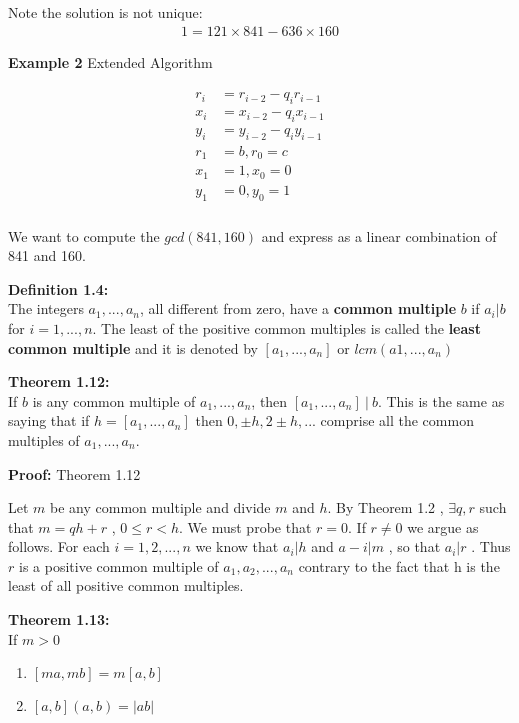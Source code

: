 \documentclass[a4paper]{article}
\begin{document}
Note the solution is not unique:
\begin{align*}
1=121\times841 - 636\times 160
\end{align*}

\textbf{Example 2} Extended Algorithm


\begin{align*}
\begin{split}
r_i&=r_{i-2} - q_ir_{i-1} \\
x_i&=x_{i-2} - q_ix_{i-1} \\
y_i&=y_{i-2} - q_iy_{i-1} \\
r_1&=b , r_0=c \\
x_1&=1 , x_0=0 \\
y_1&=0 , y_0=1 \\
\end{split}
\end{align*}



We want to compute the $gcd(841,160)$ and express as a linear combination
of 841 and 160.


\textbf{Definition 1.4:}\\
The integers $a_1,...,a_n$, all different from zero, have a
\textbf{common multiple} $b$ if $a_i|b$ for $i=1,...,n$. The least of
the positive common multiples is called the
\textbf{least common multiple} and it is denoted by
$[a_1,...,a_n]$ or $lcm(a1,...,a_n)$

\textbf{Theorem 1.12:}\\
If $b$ is any common multiple of $a_1,...,a_n$,
then $[a_1,...,a_n]\ |\ b$. This is the same as saying that if $h=[a_1,...,a_n]$
then $0,\pm h,2\pm h,...$ comprise all the common multiples of $a_1,...,a_n$.

\textbf{Proof:} Theorem 1.12

Let $m$ be any common multiple and divide $m$ and $h$. By Theorem 1.2 , $\exists
q,r$ such that $m=qh+r$ , $ 0\leq r<h.$ We must probe that $r=0$. If $r\neq0$
we argue as follows. For each $i=1,2,...,n$ we know that $a_i|h$ and $a-i|m$
, so that $a_i|r$ . Thus $r$ is a positive common multiple of $a_1,a_2,...,a_n$
contrary to the fact that h is the least of all positive common multiples.


\textbf{Theorem 1.13:}\\
If $m>0$
\begin{enumerate}
    \item $[ma,mb] = m[a,b]$
    \item $[a,b](a,b)=|ab|$
\end{enumerate}
\end{document}
